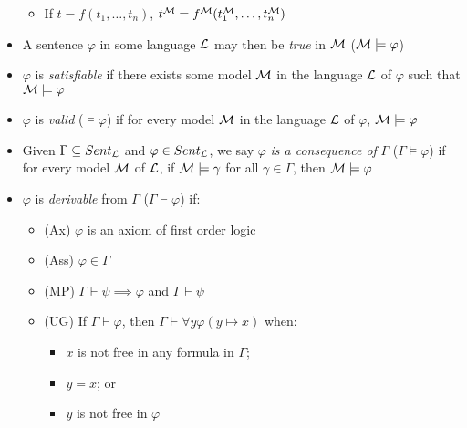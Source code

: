 \begin{itemize}
\begin{itemize}
		\item If $ t = f(t_1, \dots, t_n) $, $ t^{\mathcal{M}} = f^{\mathcal{M}} (t_1^{\mathcal{M}}, \dots, t_n^{\mathcal{M}}) $
	\end{itemize}

	\item A sentence $ \varphi $ in some language $ \mathcal{L} $ may then be \textit{true} in $ \mathcal{M} $ ($ \mathcal{M} \models \varphi $)
	
	
	\item $ \varphi $ is \textit{satisfiable} if there exists some model $ \mathcal{M} $ in the language $ \mathcal{L} $ of $ \varphi $ such that $ \mathcal{M} \models \varphi $
	
	\item $ \varphi $ is \textit{valid} ($ \models \varphi$) if for every model $ \mathcal{M} $ in the language $ \mathcal{L} $ of $ \varphi $, $ \mathcal{M} \models \varphi $
	
	\item Given $ \Gamma \subseteq Sent_{\mathcal{L}} $ and $ \varphi \in Sent_{\mathcal{L}} $, we say $ \varphi $ \textit{is a consequence of} $ \Gamma $ ($ \Gamma \models \varphi $) if for every model $ \mathcal{M} $ of $ \mathcal{L} $, if $ \mathcal{M} \models \gamma $ for all $ \gamma \in \Gamma $, then $ \mathcal{M} \models \varphi $
	
	\item $ \varphi $ is \textit{derivable} from $ \Gamma $ ($ \Gamma \vdash \varphi $) if:
	
	\begin{itemize}
		
		\item (Ax) $ \varphi $ is an axiom of first order logic
		
		\item (Ass) $ \varphi \in \Gamma $
		
		\item (MP) $ \Gamma \vdash \psi \implies \varphi $ and $ \Gamma \vdash \psi $
		
		\item (UG) If $ \Gamma \vdash \varphi $, then $ \Gamma \vdash \forall y \varphi(y \mapsto x) $ when:
		
		\begin{itemize}
			\item $ x $ is not free in any formula in $ \Gamma $;
			\item $ y = x $; or
			\item $ y $ is not free in $ \varphi $
		\end{itemize}
		
	\end{itemize}


\end{itemize}
